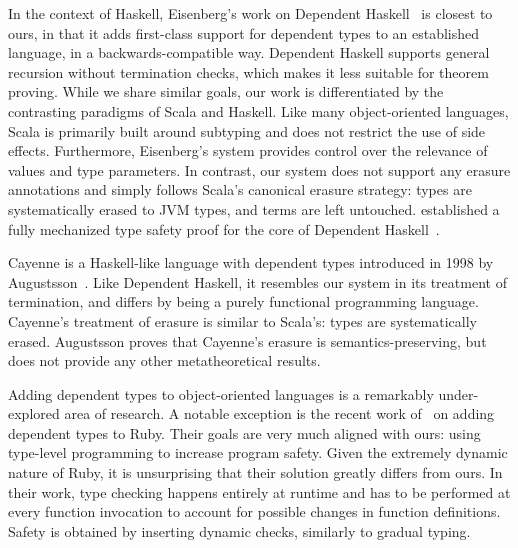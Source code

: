 In the context of Haskell, Eisenberg's work on Dependent Haskell~\citep{eisenberg2016dependent} is closest to ours, in that it adds first-class support for dependent types to an established language, in a backwards-compatible way.
Dependent Haskell supports general recursion without termination checks, which makes it less suitable for theorem proving.
While we share similar goals, our work is differentiated by the contrasting paradigms of Scala and Haskell.
Like many object-oriented languages, Scala is primarily built around subtyping and does not restrict the use of side effects.
Furthermore, Eisenberg's system provides control over the relevance of values and type parameters.
In contrast, our system does not support any erasure annotations and simply follows Scala's canonical erasure strategy: types are systematically erased to JVM types, and terms are left untouched.
\citeauthor{weirich2017a} established a fully mechanized type safety proof for the core of Dependent Haskell~\citep{weirich2017a}.

Cayenne is a Haskell-like language with dependent types introduced in 1998 by Augustsson~\citep{augustsson1998cayenne}.
Like Dependent Haskell, it resembles our system in its treatment of termination, and differs by being a purely functional programming language.
Cayenne's treatment of erasure is similar to Scala's: types are systematically erased.
Augustsson proves that Cayenne's erasure is semantics-preserving, but does not provide any other metatheoretical results.

Adding dependent types to object-oriented languages is a remarkably under-explored area of research.
A notable exception is the recent work of~\cite{kazerounian2019type} on adding dependent types to Ruby.
Their goals are very much aligned with ours: using type-level programming to increase program safety.
Given the extremely dynamic nature of Ruby, it is unsurprising that their solution greatly differs from ours.
In their work, type checking happens entirely at runtime and has to be performed at every function invocation to account for possible changes in function definitions.
Safety is obtained by inserting dynamic checks, similarly to gradual typing.

